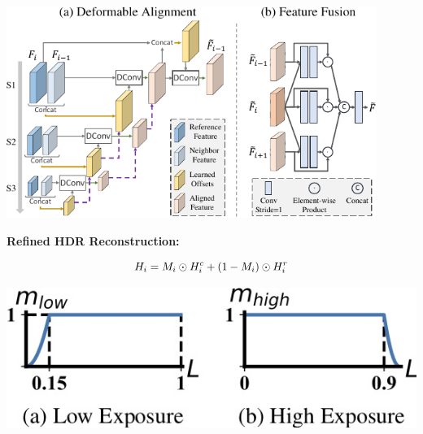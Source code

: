 \documentclass[landscape,a0paper,fontscale=0.292]{baposter}
\newcommand{\hdr}{H}
\newcommand{\coarsehdr}{\hdr^c}
\newcommand{\refinehdr}{\hdr^r}
\newcommand{\finalhdr}{\hdr}
\newcommand{\validmask}{M}
\begin{document}
\begin{poster}
{    \vspace{0.5em}
    \begin{minipage}[c]{0.48\linewidth}
        \begin{center}
            \includegraphics[width=0.9\textwidth]{images/deformable_fusion_module-crop.pdf}
        \end{center}
    \end{minipage}
    \hfill
    \begin{minipage}[c]{0.48\linewidth}
        \textbf{\footnotesize Refined HDR Reconstruction:}

        \begin{minipage}[c]{0.48\linewidth}
            \begin{equation}
                \label{eq:hdr_merge}
                \tiny
                \finalhdr_i = \validmask_i \odot \coarsehdr_i + (1 - \validmask_i) \odot \refinehdr_i
            \end{equation}
        \end{minipage}
        \hfill
        \begin{minipage}[c]{0.48\linewidth}
            \vspace{1em}
            \begin{center}
                \includegraphics[width=\textwidth]{images/blend_curve-crop.jpg}
            \end{center}
        \end{minipage}


\end{minipage}}
\end{poster}
\end{document}
